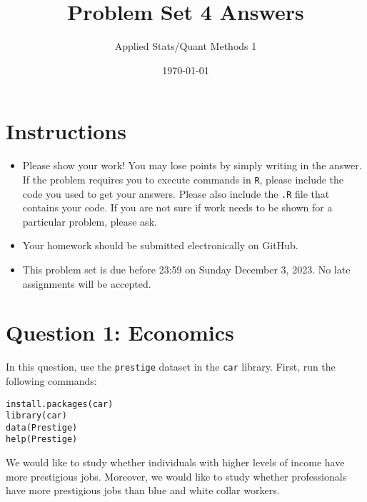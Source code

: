 \documentclass[12pt,letterpaper]{article}
\title{Problem Set 4 Answers}
\date{\today}
\author{Applied Stats/Quant Methods 1}
\begin{document}
	\maketitle
	\section*{Instructions}
	\begin{itemize}
		\item Please show your work! You may lose points by simply writing in the answer. If the problem requires you to execute commands in \texttt{R}, please include the code you used to get your answers. Please also include the \texttt{.R} file that contains your code. If you are not sure if work needs to be shown for a particular problem, please ask.
		\item Your homework should be submitted electronically on GitHub.
		\item This problem set is due before 23:59 on Sunday December 3, 2023. No late assignments will be accepted.
	\end{itemize}



	\vspace{.5cm}
\section*{Question 1: Economics}
\vspace{.25cm}
\noindent 	
In this question, use the \texttt{prestige} dataset in the \texttt{car} library. First, run the following commands:

\begin{verbatim}
install.packages(car)
library(car)
data(Prestige)
help(Prestige)
\end{verbatim} 


\noindent We would like to study whether individuals with higher levels of income have more prestigious jobs. Moreover, we would like to study whether professionals have more prestigious jobs than blue and white collar workers.
\end{document}
